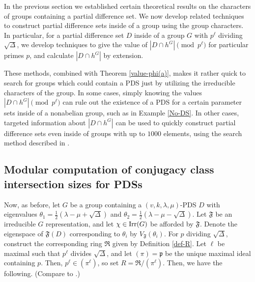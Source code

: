 \documentclass[12pt]{amsproc} %
\theoremstyle{definition}\newtheorem{defn}[thm]{Definition}
\theoremstyle{definition}\newtheorem{rem}[thm]{Remark}
\theoremstyle{definition}\newtheorem{ex}[thm]{Example}
\newcommand{\Irr}{{\rm Irr}}
\newcommand{\frakR}{\mathfrak{R}}
\newcommand{\repF}{\mathfrak{F}}
\newcommand{\p}{\mathfrak{p}}
\begin{document}
In the previous section we established certain theoretical results on the characters of groups containing a partial difference set. We now develop related techniques to construct partial difference sets inside of a group using the group characters. In particular, for a partial difference set $D$ inside of a group $G$ with $p^\ell$ dividing $\sqrt\Delta$, we develop techniques to give the value of $|D\cap h^G| \pmod{p^\ell}$ for particular primes $p$, and calculate $|D\cap h^G|$ by extension.

These methods, combined with Theorem \ref{value-phi(a)}, makes it rather quick to search for groups which could contain a PDS just by utilizing the irreducible characters of the group. In some cases, simply knowing the values $|D\cap h^G| \pmod{p^\ell}$ can rule out the existence of a PDS for a certain parameter sets inside of a nonabelian group, such as in Example \ref{No-DS}. In other cases, targeted information about $|D\cap h^G|$ can be used to quickly construct partial difference sets even inside of groups with up to $1000$ elements, using the search method described in \cite{brady}.

\subsection{Modular computation of conjugacy class intersection sizes for PDSs}

Now, as before, let $G$ be a group containing a $(v, k, \lambda, \mu)$-PDS $D$ with eigenvalues $\theta_1 = \frac12(\lambda-\mu +\sqrt{\Delta})$ and $\theta_2 = \frac12(\lambda-\mu - \sqrt{\Delta})$. Let $\repF$ be an irreducible $G$ representation, and let $\chi\in\Irr(G)$ be afforded by $\repF$. Denote the eigenspace of $\repF(D)$ corresponding to $\theta_i$ by $V_\repF (\theta_i)$. For $p$ dividing $\sqrt\Delta$, construct the corresponding ring $\frakR$ given by Definition \ref{def-R}. Let $\ell$ be maximal such that $p^\ell$ divides $\sqrt\Delta$, and let $(\pi) = \p$ be the unique maximal ideal containing $p$. Then, $p^\ell \in (\pi^\ell)$, so set $R = \frakR/(\pi^\ell)$. Then, we have the following. (Compare to \cite[Lemma 3.1]{swartz-tauscheck}.)
\end{document}
